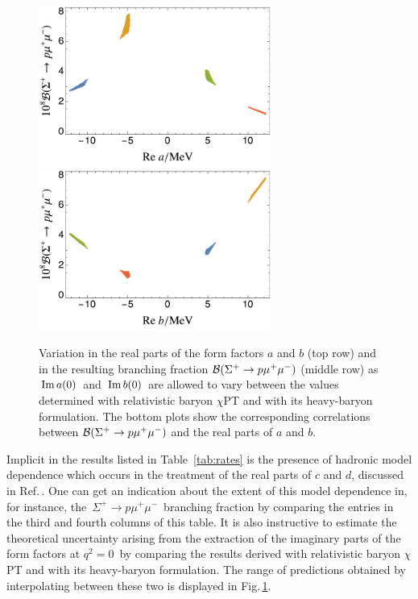 \documentclass[amsmath,amssymb,aps,nofootinbib,prd,preprint,superscriptaddress,tightenlines,a4paper,bm]{revtex4-2}
\begin{document}
\begin{figure}[b]
\includegraphics[width=3in]{rearange.pdf} ~ ~ ~ \includegraphics[width=3in]{rebrange.pdf} \vspace{-1ex}
\caption{Variation in the real parts of the form factors $a$ and $b$ (top row) and in the resulting branching fraction ${\cal B}(\Sigma^+\to p\mu^+\mu^-)$ (middle row) as \,${\rm Im}\,a(0)$\, and \,${\rm Im}\,b(0)$\, are allowed to vary between the values determined with relativistic baryon $\chi$PT and with its heavy-baryon formulation.
The bottom plots show the corresponding correlations between ${\cal B}(\Sigma^+\to p\mu^+\mu^-)$ and the real parts of $a$ and $b$.}
\label{f:ranges}
\end{figure}


Implicit in the results listed in Table~\ref{tab:rates} is the presence of hadronic model dependence which occurs in the treatment of the real parts of $c$ and $d$, discussed in Ref.\,\cite{He:2005yn}.
One can get an indication about the extent of this model dependence in, for instance, the \,$\Sigma^+\to p\mu^+\mu^-$\, branching fraction by comparing the entries in the third and fourth columns of this table.
It is also instructive to estimate the theoretical uncertainty arising from the extraction of the imaginary parts of the form factors at  $q^2=0$\, by comparing the results derived with relativistic baryon $\chi$PT and with its heavy-baryon formulation.
The range of predictions obtained by interpolating between these two  is displayed in Fig.\,\ref{f:ranges}.
\end{document}
